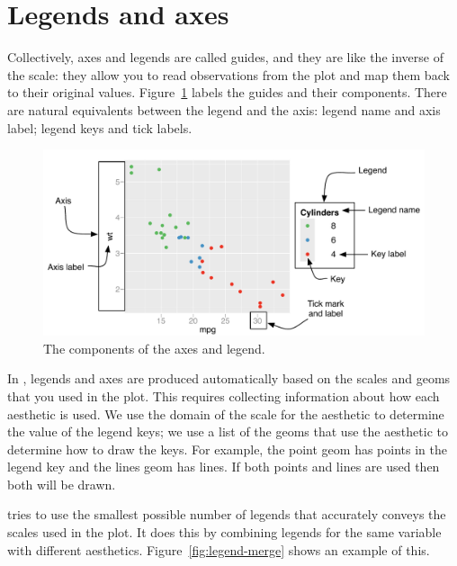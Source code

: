 \section{Legends and axes}
\label{sec:guides}

Collectively, axes and legends are called guides, and they are like the inverse of the scale: they allow you to read observations from the plot and map them back to their original values.  Figure~\ref{fig:labelled-guides} labels the guides and their components.  There are natural equivalents between the legend and the axis: legend name and axis label; legend keys and tick labels.

\begin{figure}[htbp]
  \centering
  \includegraphics[width=\textwidth]{scale-guides}
  
  \caption{The components of the axes and legend.}
  \label{fig:labelled-guides}
\end{figure}

In \ggplot, legends and axes are produced automatically based on the scales and geoms that you used in the plot. This requires collecting information about how each aesthetic is used. We use the domain of the scale for the aesthetic to determine the value of the legend keys; we use a list of the geoms that use the aesthetic to determine how to draw the keys. For example, the point geom has points in the legend key and the lines geom has lines. If both points and lines are used then both will be drawn.

\ggplot tries to use the smallest possible number of legends that accurately conveys the scales used in the plot.  It does this by combining legends for the same variable with different aesthetics.  Figure~\ref{fig:legend-merge} shows an example of this.  



